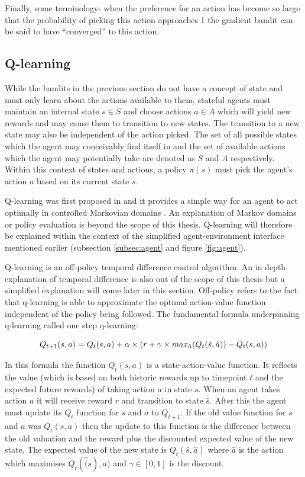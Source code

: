 Finally, some terminology- when the preference for an action has become so large that the probability of picking this action approaches 1 the gradient bandit can be said to have “converged” to this action. 

\subsection{Q-learning}

While the bandits in the previous section do not have a concept of state and must only learn about the actions available to them, stateful agents must maintain an internal state $s \in S$ and choose actions $a \in A$ which will yield new rewards and may cause them to transition to new states. The transition to a new state may also be independent of the action picked. The set of all possible states which the agent may conceivably find itself in and the set of available actions which the agent may potentially take are denoted as $S$ and $A$ respectively. Within this context of states and actions, a policy $\pi(s)$ must pick the agent’s action $a$ based on its current state $s$.

Q-learning was first proposed in \cite{watkins_dayan} and it provides a simple way for an agent to act optimally in controlled Markovian domains \cite{watkins_dayan}. An explanation of Markov domains or policy evaluation is beyond the scope of this thesis. Q-learning will therefore be explained within the context of the simplified agent-environment interface mentioned earlier (subsection \ref{subsec:agent} and figure \ref{fig:agent}). 

Q-learning is an off-policy temporal  difference control algorithm. An in depth explanation of temporal difference is also out of the scope of this thesis but a simplified explanation will come later in this section. Off-policy refers to the fact that q-learning is able to approximate the optimal action-value function independent of the policy being followed. The fundamental formula underpinning q-learning called one step q-learning:

\begin{equation}\label{eq:q-learning}
Q_{t+1}(s,a) = Q_t(s,a) + \alpha \times (r + \gamma \times max_{\hat{a}}(Q_t(\hat{s},\hat{a})) - Q_t(s,a) )\\
\end{equation}

In this formula the function $Q_t(s,a)$ is a state-action-value function. It reflects the value (which is based on both historic rewards up to timepoint $t$ and the expected future rewards) of taking action $a$ in state $s$. When an agent takes action $a$ it will receive reward $r$ and transition to state $\hat{s}$. After this the agent must update its $Q_t$ function for $s$ and $a$ to $Q_{t+1}$. If the old value function for $s$ and $a$ was $Q_t(s,a)$ then the update to this function is the difference between the old valuation and the reward plus the discounted expected value of the new state. The expected value of the new state is $Q_t(\hat{s},\hat{a})$ where $\hat{a}$ is the action which maximises $Q_t(\hat(s),a)$ and $\gamma \in [0,1]$ is the discount.

